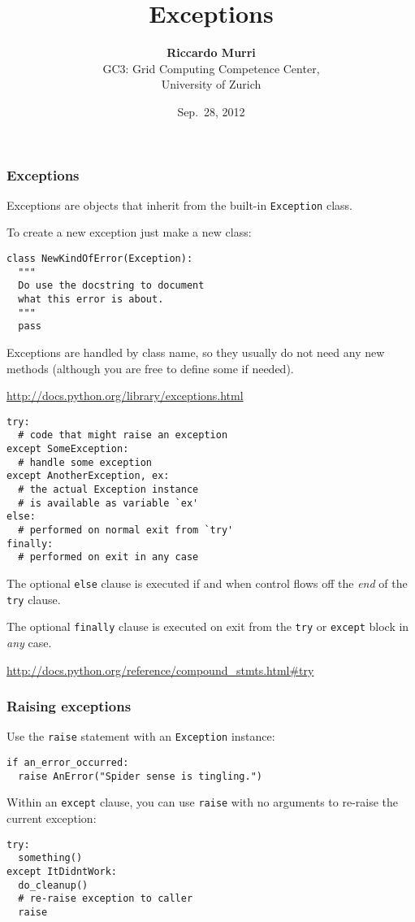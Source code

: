 \documentclass[english,serif,mathserif,xcolor=pdftex,dvipsnames,table]{beamer}
\title[Part 7]{%
  Exceptions
}
\author[R. Murri]{%
  \textbf{Riccardo Murri} \\
  GC3: Grid Computing Competence Center, \\
  University of Zurich
}
\date{Sep.~28, 2012}
\begin{document}
\maketitle

\begin{frame}[fragile]
  \frametitle{Exceptions}

  Exceptions are objects that inherit from the built-in
  \lstinline|Exception| class.

  \+
  To create a new exception just make a new class:
\begin{lstlisting}
class NewKindOfError(Exception):
  """
  Do use the docstring to document 
  what this error is about.
  """
  pass
\end{lstlisting}

  \+
  Exceptions are handled by class name, so they usually do not need
  any new methods (although you are free to define some if needed).

  \begin{seealso}
    \url{http://docs.python.org/library/exceptions.html}
  \end{seealso}
\end{frame}


\begin{frame}[fragile]
\begin{lstlisting}
try:
  # code that might raise an exception
except SomeException:
  # handle some exception
except AnotherException, ex:
  # the actual Exception instance
  # is available as variable `ex'
else:
  # performed on normal exit from `try'
finally:
  # performed on exit in any case
\end{lstlisting}

  \+
  The optional \lstinline|else| clause is executed if and when control flows off the
  \emph{end} of the \lstinline|try| clause.

  \+
  The optional \lstinline|finally| clause is executed on exit from the
  \lstinline|try| or \lstinline|except| block in \emph{any} case.

  \begin{references}
    \scriptsize
    \url{http://docs.python.org/reference/compound_stmts.html#try}
\end{references}
\end{frame}


\begin{frame}[fragile]
  \frametitle{Raising exceptions}
  
  Use the \lstinline|raise| statement with an \texttt{Exception}
  instance:
\begin{lstlisting}
if an_error_occurred:
  raise AnError("Spider sense is tingling.")
\end{lstlisting}

  \+
  Within an \lstinline|except| clause, you can use \lstinline|raise|
  with no arguments to re-raise the current exception:
\begin{lstlisting}
try:
  something()
except ItDidntWork:
  do_cleanup()
  # re-raise exception to caller
  raise
\end{lstlisting}
\end{frame}
\end{document}
